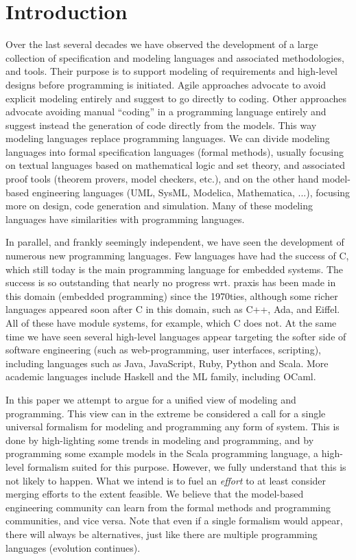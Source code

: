 
\section{Introduction}
\label{sec:introduction}

Over the last several decades we have observed the development of a 
large collection of specification and modeling languages and 
associated methodologies, and tools. Their purpose is to 
support modeling of requirements and high-level designs before 
programming is initiated. Agile approaches advocate to avoid 
explicit modeling entirely and suggest to go directly to coding. 
Other approaches advocate avoiding manual ``coding'' in a 
programming 
language entirely and suggest instead the generation of code 
directly from the models. This way modeling languages replace 
programming languages.  We can divide modeling languages into 
formal specification languages (formal methods), usually focusing 
on textual languages based on mathematical logic and set theory, 
and associated proof tools (theorem provers, model checkers, etc.), 
and on the other hand model-based engineering languages (UML, 
SysML, Modelica, Mathematica, ...), focusing more on design, code 
generation and simulation. Many of these modeling languages have 
similarities with programming languages.

In parallel, and frankly seemingly independent, we have seen the 
development of numerous new programming languages. Few languages 
have had the success of C, which still today is the main 
programming language for embedded systems. The success is so 
outstanding that nearly no progress wrt. praxis has been made in 
this domain (embedded programming) since the 1970ties, although some richer languages appeared soon after C in this domain, such as 
C++, Ada, and Eiffel. All of these have module systems, for example, which C does not. At the same time we have seen several 
high-level languages appear targeting the softer side of software 
engineering (such as web-programming, user interfaces, scripting), 
including languages such as Java, JavaScript, Ruby, Python and 
Scala.  More academic languages include Haskell and the ML family, 
including OCaml.

In this paper we attempt to argue for a unified view of modeling
and programming. This view can in the extreme be considered a call
for a single universal formalism for modeling and programming any
form of system. This is done by high-lighting some trends in 
modeling and programming, and by programming some example
models in the Scala programming language, a high-level formalism
suited for this purpose.
However, we fully understand that this is not likely
to happen. What we intend is to fuel an {\em effort} to at least consider
merging efforts to the extent feasible. We believe that the model-based
engineering community can learn from the formal methods and 
programming communities, and vice versa. Note that even if a single
formalism would appear, there will always be alternatives, just like
there are multiple programming languages (evolution continues). 

